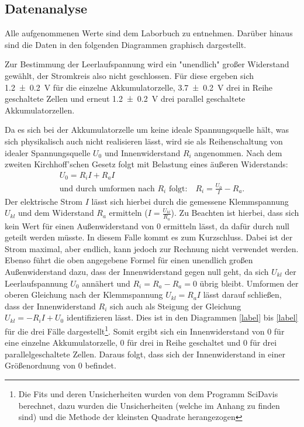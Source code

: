 \subsection{Datenanalyse}

Alle aufgenommenen Werte sind dem Laborbuch zu entnehmen. 
Darüber hinaus sind die Daten in den folgenden Diagrammen graphisch dargestellt.

Zur Bestimmung der Leerlaufspannung wird ein "unendlich" großer Widerstand gewählt, der Stromkreis also nicht geschlossen.
Für diese ergeben sich \SI{1,2+-0,2}{V} für die einzelne Akkumulatorzelle, \SI{3,7+-0,2}{V} drei in Reihe geschaltete Zellen und erneut \SI{1,2+-0,2}{V} drei parallel geschaltete Akkumulatorzellen. 

Da es sich bei der Akkumulatorzelle um keine ideale Spannungsquelle hält, was sich physikalisch auch nicht realisieren lässt, wird sie als Reihenschaltung von idealer Spannungsquelle $U_0$ und Innenwiderstand $R_i$ angenommen. 
Nach dem zweiten Kirchhoff'schen Gesetz folgt mit Belastung eines äußeren Widerstands:
\begin{align}
	U_0 = R_i I + R_a I \\
	\text{und durch umformen nach $R_i$ folgt:} \quad R_i = \frac{U_0}{I}-R_a.
\end{align}
Der elektrische Strom $I$ lässt sich hierbei durch die gemessene Klemmspannung $U_{kl}$ und dem Widerstand $R_a$ ermitteln ($I=\frac{U_{kl}}{R_a}$).
Zu Beachten ist hierbei, dass sich kein Wert für einen Außenwiderstand von \SI{0}{\Omega} ermitteln lässt, da dafür durch null geteilt werden müsste.
In diesem Falle kommt es zum Kurzschluss.
Dabei ist der Strom maximal, aber endlich, kann jedoch zur Rechnung nicht verwendet werden.
Ebenso führt die oben angegebene Formel für einen unendlich großen Außenwiderstand dazu, dass der Innenwiderstand gegen null geht, da sich $U_{kl}$ der Leerlaufspannung $U_0$ annähert und $R_i = R_a - R_a = 0$ übrig bleibt.
Umformen der oberen Gleichung nach der Klemmspannung $U_{kl} = R_a I$ lässt darauf schließen, dass der Innenwiderstand $R_i$ sich auch als Steigung der Gleichung $U_{kl} = -R_i I + U_0$ identifizieren lässt. Dies ist in den Diagrammen \ref{label} bis \ref{label} für die drei Fälle dargestellt\footnote{Die Fits und deren Unsicherheiten wurden von dem Programm SciDavis berechnet, dazu wurden die Unsicherheiten (welche im Anhang zu finden sind) und die Methode der kleinsten Quadrate herangezogen}.
Somit ergibt sich ein Innenwiderstand von \SI{0}{\Omega} für eine einzelne Akkumulatorzelle, \SI{0}{\Omega} für drei in Reihe geschaltet und \SI{0}{\Omega} für drei parallelgeschaltete Zellen. %
Daraus folgt, dass sich der Innenwiderstand in einer Größenordnung von \SI{0}{\Omega} befindet. %


